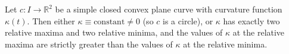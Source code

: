Let $c: I \to \mathbb{R}^2$ be a simple closed convex plane curve with curvature function $\kappa(t)$. Then either $\kappa \equiv \text{constant} \neq 0$ (so $c$ is a circle), or $\kappa$ has exactly two relative maxima and two relative minima, and the values of $\kappa$ at the relative maxima are strictly greater than the values of $\kappa$ at the relative minima.
